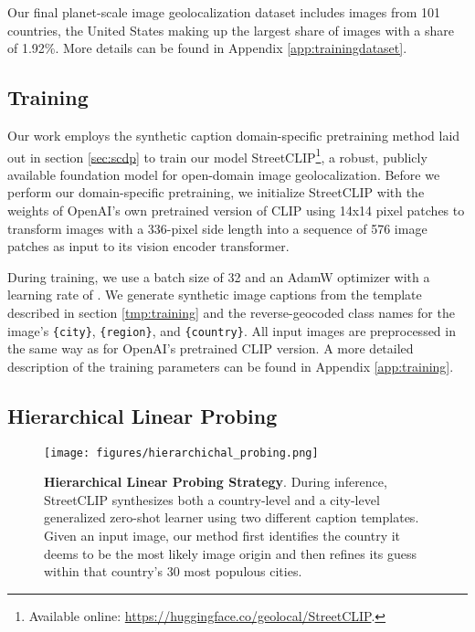 \documentclass{article}
\renewcommand{\cite}[1]{\citep{#1}}
\begin{document}
Our final planet-scale image geolocalization dataset includes images from 101 countries, the United States making up the largest share of images with a share of 1.92\%. More details can be found in Appendix \ref{app:trainingdataset}.

\subsection{Training}

Our work employs the synthetic caption domain-specific pretraining method laid out in section \ref{sec:scdp} to train our model StreetCLIP\footnote{Available online: \href{https://huggingface.co/geolocal/StreetCLIP}{https://huggingface.co/geolocal/StreetCLIP}.}, a robust, publicly available foundation model for open-domain image geolocalization. Before we perform our domain-specific pretraining, we initialize StreetCLIP with the weights of OpenAI's own pretrained version of CLIP \cite{clip_large} using 14x14 pixel patches to transform images with a 336-pixel side length into a sequence of 576 image patches as input to its vision encoder transformer.

During training, we use a batch size of 32 and an AdamW optimizer \cite{loshchilov_2017} with a learning rate of . We generate synthetic image captions from the template described in section \ref{tmp:training} and the reverse-geocoded class names for the image's \texttt{\{city\}}, \texttt{\{region\}}, and \texttt{\{country\}}. All input images are preprocessed in the same way as for OpenAI's pretrained CLIP version. A more detailed description of the training parameters can be found in Appendix \ref{app:training}.

\subsection{Hierarchical Linear Probing}
\label{sec:probing}

\begin{figure}[htb]
\vskip 0.2in
\begin{center}
\centerline{\texttt{[image: figures/hierarchichal\_probing.png]}}
\caption{\textbf{Hierarchical Linear Probing Strategy}. During inference, StreetCLIP synthesizes both a country-level and a city-level generalized zero-shot learner using two different caption templates. Given an input image, our method first identifies the country it deems to be the most likely image origin and then refines its guess within that country's 30 most populous cities.}
\label{fig:linear_probe}
\end{center}
\vskip -0.1in
\end{figure}
\end{document}
